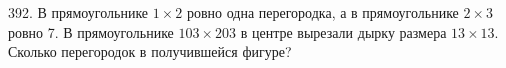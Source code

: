 392. В прямоугольнике $1\times2$ ровно одна перегородка, а в прямоугольнике $2\times3$ ровно 7. В прямоугольнике $103\times203$ в центре вырезали
дырку размера $13\times13.$ Сколько перегородок в получившейся фигуре?\\
